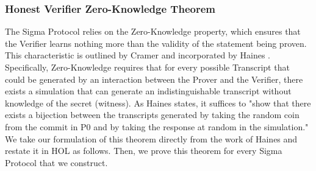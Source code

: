 \subsubsection{Honest Verifier Zero-Knowledge Theorem}
The Sigma Protocol relies on the Zero-Knowledge property, which ensures that the Verifier learns nothing more than the validity of the statement being proven. This characteristic is outlined by Cramer \cite{Cramer1997ModularDO} and incorporated by Haines \cite{Haines2019VerifiedVF}. Specifically, Zero-Knowledge requires that for every possible Transcript that could be generated by an interaction between the Prover and the Verifier, there exists a simulation that can generate an indistinguishable transcript without knowledge of the secret (witness).
As Haines \cite{Haines2021DidYM} states, it suffices to "show that there exists a bijection between the transcripts generated by taking the random coin from the commit in P0 and by taking the response at random in the simulation." We take our formulation of this theorem directly from the work of Haines and restate it in HOL as follows. Then, we prove this theorem for every Sigma Protocol that we construct.


